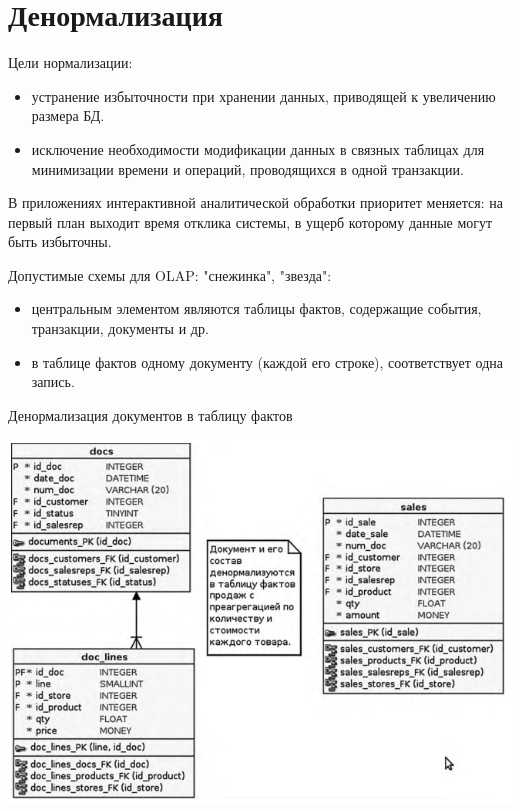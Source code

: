 \documentclass{beamer}
\begin{document}
\section{Денормализация}
\begin{frame}
Цели нормализации:
\begin{itemize}
\item устранение избыточности при хранении данных, приводящей к увеличению размера БД.
\item исключение необходимости модификации данных в связных таблицах для минимизации времени и операций, проводящихся в одной транзакции.
\end{itemize}
В приложениях интерактивной аналитической обработки приоритет меняется: на первый план выходит время отклика системы, в ущерб которому данные могут быть избыточны.
\end{frame}

\begin{frame}
Допустимые схемы для OLAP: "снежинка", "звезда":
\begin{itemize}
\item центральным элементом являются таблицы фактов, содержащие события, транзакции, документы и др.
\item в таблице фактов одному документу (каждой его строке), соответствует одна запись.
\end{itemize}
\begin{block}{Денормализация документов в таблицу фактов}
\begin{center}
\includegraphics[scale=0.4]{images/denorm.png}
\end{center}
\end{block}
\end{frame}
\end{document}
